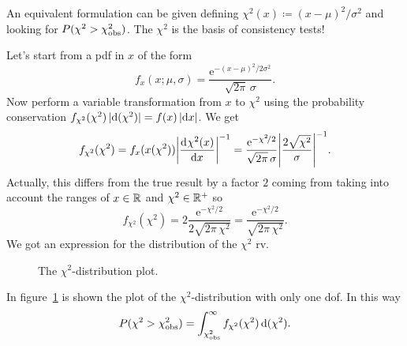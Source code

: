 \documentclass[
	10pt,
	draft
]{scrreprt}
\newcommand{\eu}{\ensuremath{\mathrm{e}}}
\newcommand{\deriv}[3][]{\dfrac{\ud^{#1}#2}{\ud #3^{#1}}}%
\begin{document}
An equivalent formulation can be given defining $\chi^2(x)\coloneqq (x-\mu)^2\!/\sigma^2$ and looking for $P(\chi^2 > \chi^2_\textup{obs})$.
The $\chi^2$ is the basis of consistency tests!


Let's start from a \ac{pdf} in $x$ of the form
\begin{equation}
f_x(x;\mu,\sigma) = \frac{\eu^{-(x-\mu)^2\!/2\sigma^2} }{\sqrt{2\pi}\,\sigma}.
\end{equation}
Now perform a variable transformation from $x$ to $\chi^2$ using the probability conservation $f_{\chi^2}(\chi^2)\,\lvert\mathop{}\!\mathrm{d}(\chi^2)\rvert = f(x) \,\lvert\mathop{}\!\mathrm{d} x\rvert$.
We get
\begin{equation}
f_{\chi^2}(\chi^2) %
= f_x(x(\chi^2)) \abs*{\deriv{\chi^2(x)}{x}}^{-1}
= \frac{\eu^{-\chi^2\!/2} }{\sqrt{2\pi}\,\sigma} \abs*{\frac{2\sqrt{\chi^2}}{\sigma}}^{-1}.
\end{equation}
Actually, this differs from the true result by a factor $2$ coming from taking into account the ranges of $x\in\mathbb{R}$ and $\chi^2 \in\mathbb{R}^+$ so
\begin{equation}
f_{\chi^2}(\chi^2) = 2 \frac{\eu^{-\chi^2\!/2} }{2\sqrt{2\pi\,\chi^2}} = \frac{\eu^{-\chi^2\!/2} }{\sqrt{2\pi\,\chi^2}}.
\end{equation}
We got an expression for the distribution of the $\chi^2$ \ac{rv}.
\begin{figure}
	\centering
{}
	\caption{The $\chi^2$-distribution plot.}
	\label{fig:chi2distro}
\end{figure}
In figure~\ref{fig:chi2distro} is shown the plot of the $\chi^2$-distribution with only one \ac{dof}.
In this way
\begin{equation}
P(\chi^2 > \chi^2_\textup{obs})
= 
\int_{\chi^2_\textup{obs}}^\infty f_{\chi^2}(\chi^2)\mathop{}\!\mathrm{d} (\chi^2).
\end{equation}
\end{document}

